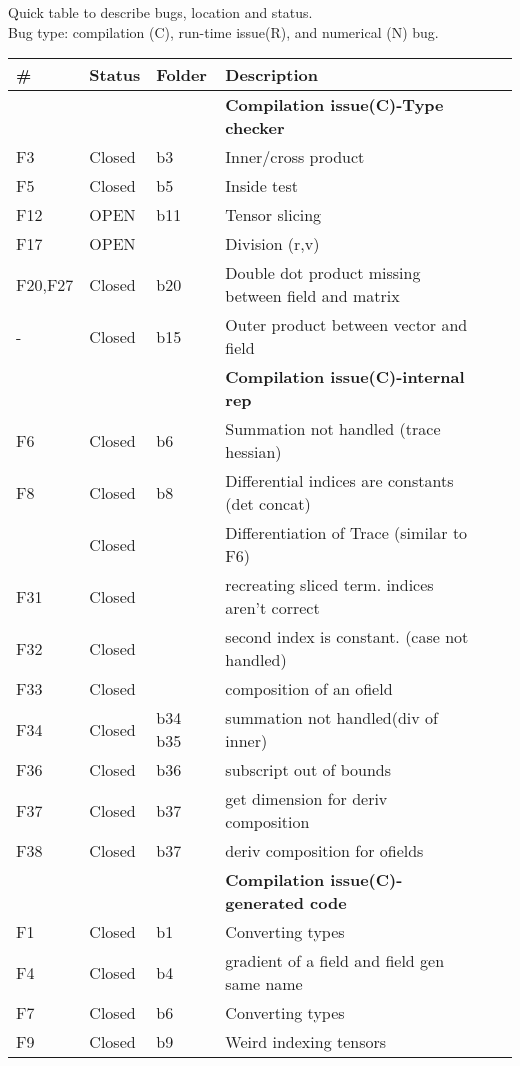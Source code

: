 \documentclass{article}
\begin{document}
Quick table to describe bugs, location and status.\\
Bug type:  compilation (C), run-time issue(R), and numerical (N) bug.\\



\begin{tabular}{|l|ll|lll|}
\hline
\# & Status & Folder & Description \\
\hline
\hline
&&& \textbf{Compilation issue(C)-Type checker}\\
\hline
 F3 &Closed&b3  & Inner/cross product  \\
 F5 &Closed&b5& Inside test\\
  F12 &OPEN & b11 & Tensor slicing\\
F17 &OPEN &   & Division (r,v)\\
  F20,F27 &Closed &  b20 & Double dot product missing between field and matrix\\
- &  Closed & b15 & Outer product between vector and field \\
  \hline
  \hline
   &&& \textbf{Compilation issue(C)-internal rep}\\
     \hline
   F6 &Closed &b6  & Summation not handled (trace hessian) \\
     F8 &Closed &b8 &Differential indices are constants (det concat)\\
   & Closed  & &Differentiation of Trace (similar to F6)\\
  F31 & Closed & & recreating sliced term. indices aren't correct\\
   F32 & Closed & & second index is  constant. (case not handled)\\
   F33 & Closed && composition of an ofield\\
   F34 & Closed &b34 b35&summation not handled(div of inner)\\ 
   F36 & Closed & b36 & subscript out of bounds \\
   F37 & Closed & b37 & get dimension for deriv composition\\
   F38 & Closed & b37 &  deriv composition for ofields\\
  \hline
  \hline 
 &&& \textbf{Compilation issue(C)-generated code}\\
 \hline
 F1 &Closed& b1& Converting types\\
  F4 &Closed&b4 & gradient of a field and  field gen same name\\
  F7 &Closed& b6  & Converting types\\
F9 &Closed&b9 & Weird indexing tensors\\

\end{tabular}
\end{document}
